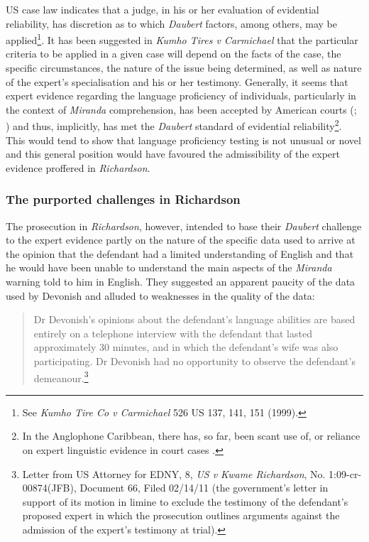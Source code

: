 \documentclass[output=paper,colorlinks,citecolor=brown]{langscibook}
\begin{document}
US case law indicates that a judge, in his or her evaluation of evidential reliability, has discretion as to which \emph{Daubert} factors, among others, may be applied\footnote{See \emph{Kumho Tire Co v Carmichael} 526 US 137, 141, 151 (1999).}. It has been suggested in \emph{Kumho Tires v Carmichael} that the particular criteria to be applied in a given case will depend on the facts of the case, the specific circumstances, the nature of the issue being determined, as well as nature of the expert’s specialisation and his or her testimony. Generally, it seems that expert evidence regarding the language proficiency of individuals, particularly in the context of \emph{Miranda} comprehension, has been accepted by American courts (\citealt[27--228]{TiersmaSolan2002}; \citealt[660]{AinsworthJanet2006}) and thus, implicitly, has met the \emph{Daubert} standard of evidential reliability\footnote{In the Anglophone Caribbean, there has, so far, been scant use of, or reliance on expert linguistic evidence in court cases \citep{Steele2009,Blake2019}.}.  This would tend to show that language proficiency testing is not unusual or novel and this general position would have favoured the admissibility of the expert evidence proffered in \emph{Richardson}.

\subsubsection{The purported challenges in Richardson}

The prosecution in \emph{Richardson}, however, intended to base their \emph{Daubert} challenge to the expert evidence partly on the nature of the specific data used to arrive at the opinion that the defendant had a limited understanding of English and that he would have been unable to understand the main aspects of the \emph{Miranda} warning told to him in English. They suggested an apparent paucity of the data used by Devonish and alluded to weaknesses in the quality of the data: 

\begin{quote}
    Dr Devonish’s opinions about the defendant’s language abilities are based entirely on a telephone interview with the defendant that lasted approximately 30 minutes, and in which the defendant’s wife was also participating. Dr Devonish had no opportunity to observe the defendant’s demeanour.\footnote{Letter from US Attorney for EDNY, 8, \emph{US v Kwame Richardson}, No. 1:09-cr-00874(JFB), Document 66, Filed 02/14/11 (the government’s letter in support of its motion in limine to exclude the testimony of the defendant’s proposed expert in which the prosecution outlines arguments against the admission of the expert’s testimony at trial).} 
\end{quote}
   
\end{document}
